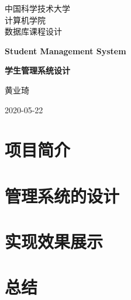 \documentclass[10pt,english, openany]{book}
\begin{document}

\begin{titlepage}
	\clearpage\thispagestyle{empty}
	\centering
	\vspace{1cm}

	{\normalsize 中国科学技术大学\\
	计算机学院\\
	数据库课程设计 \par}
		\vspace{3cm}
	{\Huge \textbf{Student Management System}} \\
	\vspace{1cm}
	{\large \textbf{学生管理系统设计} \par}
	\vspace{4cm}
	{\normalsize 黄业琦\par}
	\vspace{5cm}
    
    \centering 
    
    \vspace{0.5cm}
		
	{\normalsize 2020-05-22 \par}
	
	\pagebreak

\end{titlepage}

\tableofcontents{}

\mainmatter

\chapter{项目简介}






\chapter{管理系统的设计}


\chapter{实现效果展示}


\chapter{总结}


\pagebreak


\pagebreak
\end{document}
